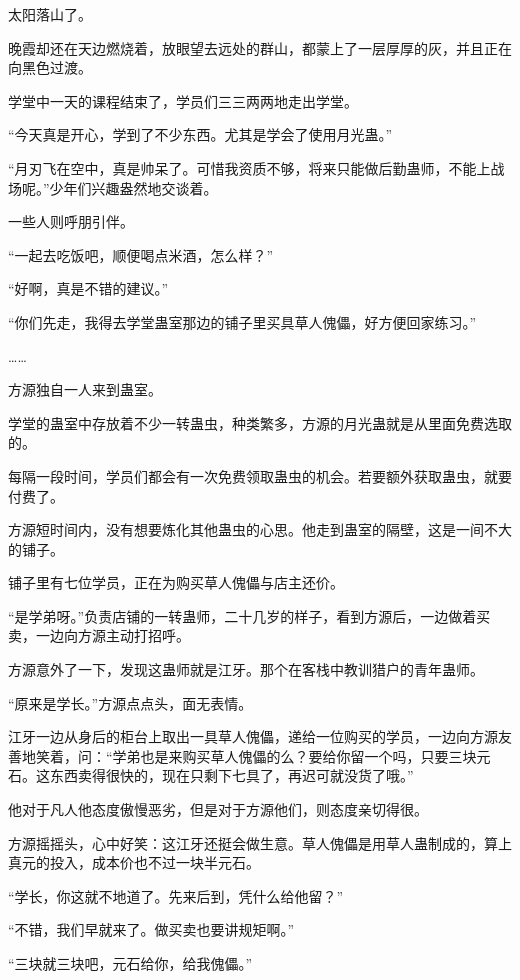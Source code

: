 
\begin{this_body}

太阳落山了。

晚霞却还在天边燃烧着，放眼望去远处的群山，都蒙上了一层厚厚的灰，并且正在向黑色过渡。

学堂中一天的课程结束了，学员们三三两两地走出学堂。

“今天真是开心，学到了不少东西。尤其是学会了使用月光蛊。”

“月刃飞在空中，真是帅呆了。可惜我资质不够，将来只能做后勤蛊师，不能上战场呢。”少年们兴趣盎然地交谈着。

一些人则呼朋引伴。

“一起去吃饭吧，顺便喝点米酒，怎么样？”

“好啊，真是不错的建议。”

“你们先走，我得去学堂蛊室那边的铺子里买具草人傀儡，好方便回家练习。”

……

方源独自一人来到蛊室。

学堂的蛊室中存放着不少一转蛊虫，种类繁多，方源的月光蛊就是从里面免费选取的。

每隔一段时间，学员们都会有一次免费领取蛊虫的机会。若要额外获取蛊虫，就要付费了。

方源短时间内，没有想要炼化其他蛊虫的心思。他走到蛊室的隔壁，这是一间不大的铺子。

铺子里有七位学员，正在为购买草人傀儡与店主还价。

“是学弟呀。”负责店铺的一转蛊师，二十几岁的样子，看到方源后，一边做着买卖，一边向方源主动打招呼。

方源意外了一下，发现这蛊师就是江牙。那个在客栈中教训猎户的青年蛊师。

“原来是学长。”方源点点头，面无表情。

江牙一边从身后的柜台上取出一具草人傀儡，递给一位购买的学员，一边向方源友善地笑着，问：“学弟也是来购买草人傀儡的么？要给你留一个吗，只要三块元石。这东西卖得很快的，现在只剩下七具了，再迟可就没货了哦。”

他对于凡人他态度傲慢恶劣，但是对于方源他们，则态度亲切得很。

方源摇摇头，心中好笑：这江牙还挺会做生意。草人傀儡是用草人蛊制成的，算上真元的投入，成本价也不过一块半元石。

“学长，你这就不地道了。先来后到，凭什么给他留？”

“不错，我们早就来了。做买卖也要讲规矩啊。”

“三块就三块吧，元石给你，给我傀儡。”


\end{this_body}
